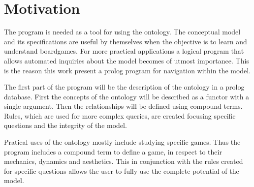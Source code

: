 \section{Motivation}

The program is needed as a tool for using the ontology. The conceptual model and its specifications are useful by themselves when the objective is to learn and understand boardgames. For more practical applications a logical program that allows automated inquiries about the model becomes of utmost importance. This is the reason this work present a prolog program for navigation within the model.

The first part of the program will be the description of the ontology in a prolog database. First the concepts of the ontology will be described as a functor with a single argument. Then the relationships will be defined using compound terms.  Rules, which are used for more complex queries, are created focusing specific questions and the integrity of the model.

Pratical uses of the ontology mostly include studying specific games. Thus the program includes a compound term to define a game, in respect to their mechanics, dynamics and aesthetics. This in conjunction with the rules created for specific questions allows the user to fully use the complete potential of the model.